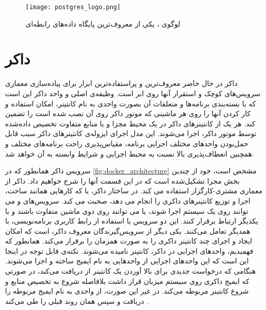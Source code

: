 \begin{figure}[!h]
\centerline{\texttt{[image: postgres\_logo.png]}}
\caption{لوگوی ، یکی از معروف‌ترین پایگاه داده‌های رابطه‌ای\cite{postgresqlPostgreSQL}}
\label{fig:postgres_logo}
\end{figure}

\section{داکر}
داکر در حال حاضر معروف‌ترین و پراستفاده‌ترین ابزار برای پیاده‌سازی معماری سرویس‌های کوچک و استقرار آنها روی ابر است.  وظیفه‌ی اصلی و واحد داکر این است که با بسته‌بندی برنامه‌ها و متعلقات آن بصورت واحدی به نام کانتینر، امکان استفاده و کار کردن آنها را روی هر ماشینی که موتور داکر روی آن نصب شده است را تضمین کند. هر یک از کانتینرهای داکر در یک محیط مجزا و با منابع متفاوت تخصیص داده‌شده توسط موتور داکر، اجرا می‌شوند. این مدل اجرای ایزوله‌ی کانتینرهای داکر سبب قابل حمل‌بودن واحدهای مختلف اجرایی برنامه، مقیاس‌پذیری راحت برنامه‌های مختلف و همچنین انعطاف‌پذیری بالا نسبت به محیط اجرایی و شرایط وابسته به آن خواهد شد\cite{anderson2015docker, dockerDockerOverview}.

سرویس داکر همانطور که در \cref{fig:docker_architecture}\cite{dockerDockerOverview} مشخص است، خود از چندین بخش مجزا تشکیل‌شده است که در این قسمت آنها را شرح 
خواهیم داد. داکر از معماری مشتری-کارگزار استفاده می کند. در ساختار داکر،  با  که کارهایی همانند ساخت، اجرا و توزیع کانتینرهای داکری را انجام می دهد، صحبت می کند. سرویس‌های  و  می توانند روی یک سیستم اجرا شوند، یا می توانند روی دوی ماشین متفاوت باشند و با یکدیگر ارتباط برقرار کنند. این دو سرویس با استفاده از رابط کاربری برنامه‌نویسی، با همدیگر تعامل می‌کنند. یکی دیگر از سرویس‌گیرندگان معروف داکر،  است که امکان ایجاد و اجرای چند کانتینر داکری را به صورت همزمان را برقرار می‌کند. همانطور که فهمیدیم، واحد‌های اجرایی در داکر، کانتینر نامیده می‌شوند. نکته‌ی قابل توجه در اینجا این است که این واحد‌های اجرایی از واحد‌هایی به نام ایمیج ساخته و اجرا می‌شوند. هنگامی که  درخواست جدیدی برای بالا آوردن یک کانتینر از  دریافت می‌کند، در صورتی که ایمیج داکری روی سیستم میزبان قرار داشت بلافاصله شروع به تخصیص منابع و شروع کانتینر مربوطه می‌کند. در غیر این صورت، از واحدی به نام  ایمیج مربوطه را دریافت و سپس همان روند قبلی را طی می‌کند \cite{dockerDockerOverview}.


